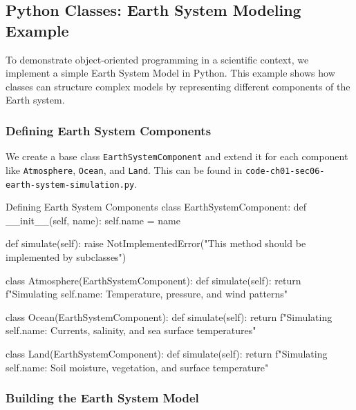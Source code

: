 \subsection{Python Classes: Earth System Modeling Example}

To demonstrate object-oriented programming in a scientific context, we implement a simple Earth System Model in Python. This example shows how classes can structure complex models by representing different components of the Earth system.

%
\subsubsection{Defining Earth System Components}

We create a base class \texttt{EarthSystemComponent} and extend it for each component like \texttt{Atmosphere}, \texttt{Ocean}, and \texttt{Land}. This can be found in \texttt{code-ch01-sec06-earth-system-simulation.py}.

\begin{codeonly}{Defining Earth System Components}
class EarthSystemComponent:
    def __init__(self, name):
        self.name = name

    def simulate(self):
        raise NotImplementedError("This method should be implemented by subclasses")

class Atmosphere(EarthSystemComponent):
    def simulate(self):
        return f"Simulating {self.name}: Temperature, pressure, and wind patterns"

class Ocean(EarthSystemComponent):
    def simulate(self):
        return f"Simulating {self.name}: Currents, salinity, and sea surface temperatures"

class Land(EarthSystemComponent):
    def simulate(self):
        return f"Simulating {self.name}: Soil moisture, vegetation, and surface temperature"
\end{codeonly}

%
\subsubsection{Building the Earth System Model}

